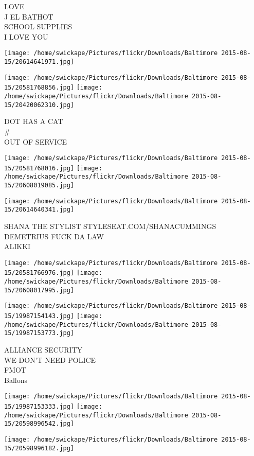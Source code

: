 \documentclass[10pt,letterpaper]{article}
\begin{document}
LOVE\\
J EL BATHOT\\
SCHOOL SUPPLIES\\
I LOVE YOU
\pagebreak

\texttt{[image: /home/swickape/Pictures/flickr/Downloads/Baltimore 2015-08-15/20614641971.jpg]}

\vspace{0.25in}
\texttt{[image: /home/swickape/Pictures/flickr/Downloads/Baltimore 2015-08-15/20581768856.jpg]}
\texttt{[image: /home/swickape/Pictures/flickr/Downloads/Baltimore 2015-08-15/20420062310.jpg]}

DOT HAS A CAT\\
\#\\
OUT OF SERVICE
\pagebreak

\texttt{[image: /home/swickape/Pictures/flickr/Downloads/Baltimore 2015-08-15/20581768016.jpg]}
\texttt{[image: /home/swickape/Pictures/flickr/Downloads/Baltimore 2015-08-15/20608019085.jpg]}

\vspace{0.25in}
\texttt{[image: /home/swickape/Pictures/flickr/Downloads/Baltimore 2015-08-15/20614640341.jpg]}

SHANA THE STYLIST STYLESEAT.COM/SHANACUMMINGS\\
DEMETRIUS FUCK DA LAW\\
ALIKKI
\pagebreak

\texttt{[image: /home/swickape/Pictures/flickr/Downloads/Baltimore 2015-08-15/20581766976.jpg]}
\texttt{[image: /home/swickape/Pictures/flickr/Downloads/Baltimore 2015-08-15/20608017995.jpg]}

\texttt{[image: /home/swickape/Pictures/flickr/Downloads/Baltimore 2015-08-15/19987154143.jpg]}
\texttt{[image: /home/swickape/Pictures/flickr/Downloads/Baltimore 2015-08-15/19987153773.jpg]}

ALLIANCE SECURITY\\
WE DON'T NEED POLICE\\
FMOT\\
Ballons
\pagebreak

\texttt{[image: /home/swickape/Pictures/flickr/Downloads/Baltimore 2015-08-15/19987153333.jpg]}
\texttt{[image: /home/swickape/Pictures/flickr/Downloads/Baltimore 2015-08-15/20598996542.jpg]}

\texttt{[image: /home/swickape/Pictures/flickr/Downloads/Baltimore 2015-08-15/20598996182.jpg]}
\end{document}
